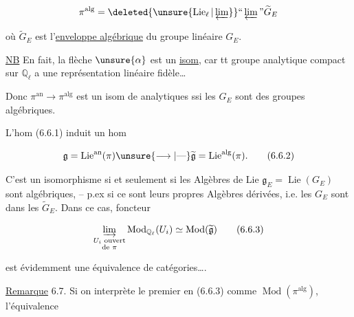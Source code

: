 \[
\pi^{\mathrm{alg}}=\deleted{\unsure{\operatorname{Lie}_\ell|\varprojlim}}\text{``}\varprojlim\text{''}\widetilde G_E
\]

où $\widetilde G_E$ est l'\uline{enveloppe algébrique} du groupe linéaire $G_E$.

\uline{NB} En fait, la flèche $\unsure{\alpha}$ est un \uline{isom}, car tt groupe analytique compact sur $\mathbb Q_\ell$ a une représentation linéaire fidèle\ldots
{}

Donc $\pi^{\mathrm{an}}\longrightarrow\pi^{\mathrm{alg}}$ est un isom de  analytiques ssi  les $G_E$ sont  des groupes  algébriques. 


L'hom (6.6.1) induit un hom

\[
\mathfrak g=\operatorname{Lie}^{\mathrm{an}}(\pi)\unsure{\longrightarrow|\text{---}}\widetilde{\mathfrak g}=\operatorname{Lie}^{\mathrm{alg}}(\pi).
\tag*{(6.6.2)}
\]

C'est un isomorphisme si et seulement si les Algèbres de Lie $\mathfrak g_E=\operatorname{Lie}(G_E)$ sont algébriques, -- p.ex si ce sont leurs propres Algèbres dérivées, i.e. les $G_E$ sont  dans les $\widetilde G_E$. Dans ce cas,  foncteur

\[
\varinjlim_{\substack{U_i\text{ ouvert}\\\text{de }\pi}}\operatorname{Mod}_{\mathbb Q_\ell}(U_i)\simeq\operatorname{Mod}(\widetilde{\mathfrak g})
\tag*{(6.6.3)}
\]

est évidemment une équivalence de catégories\ldots.


\uline{Remarque} 6.7. Si on interprète le premier  en (6.6.3) comme $\operatorname{Mod}(\pi^{\mathrm{alg}})$, l'équivalence
